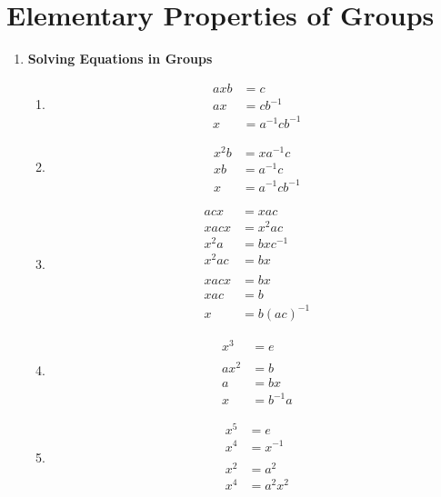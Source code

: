 \chapter{Elementary Properties of Groups}
\label{ch:elementary-properties-of-groups}

\begin{enumerate}[label={\Alph*.},font={\bfseries}]
\item {\bf Solving Equations in Groups}
  \begin{enumerate}[label={\arabic*},font={\bfseries}]
  \item
    \begin{align*}
      axb &= c \\
      ax &= cb^{-1} \\
      x &= a^{-1}cb^{-1}
    \end{align*}
  \item
    \begin{align*}
      x^2b &= xa^{-1}c \\
      xb &= a^{-1}c \\
      x &= a^{-1}cb^{-1}
    \end{align*}
  \item
    \begin{align*}
      acx &= xac \\
      xacx &= x^2ac
      \\
      x^2a &= bxc^{-1} \\
      x^2ac &= bx \\
      \\
      xacx &= bx \\
      xac &= b \\
      x &= b(ac)^{-1}
    \end{align*}
  \item
    \begin{align*}
      x^3 &= e \\
      \\
      ax^2 &= b \\
      a &= bx \\
      x &= b^{-1}a
    \end{align*}
  \item
    \begin{align*}
      x^5 &= e \\
      x^4 &= x^{-1} \\
      \\
      x^2 &= a^2 \\
      x^4 &= a^2x^2 \\

\end{align*}
\end{enumerate}
\end{enumerate}
